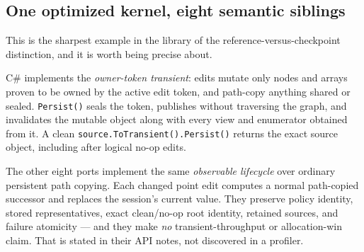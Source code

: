\documentclass[11pt,twoside,openright]{book}
\newcommand{\code}[1]{\texorpdfstring{\textcolor{d7ink}{\texttt{#1}}}{#1}}
\newcommand{\term}[1]{\textit{#1}}
\begin{document}
\subsection{One optimized kernel, eight semantic siblings}

This is the sharpest example in the library of the reference-versus-checkpoint
distinction, and it is worth being precise about.

C\# implements the \term{owner-token transient}: edits mutate only nodes and
arrays proven to be owned by the active edit token, and path-copy anything
shared or sealed. \code{Persist()} seals the token, publishes without traversing
the graph, and invalidates the mutable object along with every view and
enumerator obtained from it. A clean \code{source.ToTransient().Persist()}
returns the exact source object, including after logical no-op edits.

The other eight ports implement the same \emph{observable lifecycle} over
ordinary persistent path copying. Each changed point edit computes a normal
path-copied successor and replaces the session's current value. They preserve
policy identity, stored representatives, exact clean/no-op root identity,
retained sources, and failure atomicity --- and they make \emph{no}
transient-throughput or allocation-win claim. That is stated in their API notes,
not discovered in a profiler.
\end{document}
